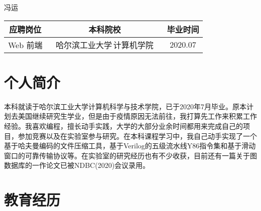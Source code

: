 \documentclass[10pt]{article} %
\begin{document}
\begin{paracol}{2} %


\parbox[top][0.12\textheight][c]{\linewidth}{ %
	\vspace{-0.04\textheight} %
	\centering %
	{\sffamily\Huge 冯运}\\
	\vspace{0.04\textheight}
	\begin{tabular}{ccc}
		\textbf{应聘岗位} & \textbf{本科院校}　& \textbf{毕业时间}\\
		\hline
		Web 前端 & 哈尔滨工业大学\,计算机学院 　& 2020.07\\
	\end{tabular}
}


\section{个人简介}

本科就读于哈尔滨工业大学计算机科学与技术学院，已于2020年7月毕业。原本计划去美国继续研究生学业，但是由于疫情原因无法前往，我打算先工作来积累工作经验。我喜欢编程，擅长动手实践，大学的大部分业余时间都用来完成自己的项目，参加竞赛以及在实验室参与研究。在本科课程学习中，我自己动手实现了一个基于哈夫曼编码的文件压缩工具，基于Verilog的五级流水线Y86指令集和基于滑动窗口的可靠传输协议等。在实验室的研究经历也有不少收获，目前还有一篇关于图数据库的一作论文已被NDBC(2020)会议录用。
\medskip %


\section{教育经历} 


\end{paracol}
\end{document}
